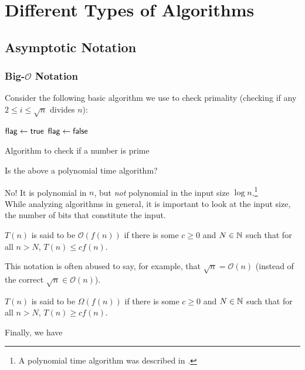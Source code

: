 \section{Different Types of Algorithms}

\subsection{Asymptotic Notation}

\subsubsection{Big-\texorpdfstring{$\mathcal{O}$}{O} Notation}

Consider the following basic algorithm we use to check primality (checking if any $2\leq i\leq \sqrt{n}$ divides $n$):

\begin{algorithm}
	\DontPrintSemicolon
	$\mathsf{flag}\gets\mathsf{true}$\;
	 {
		 {
			$\mathsf{flag}\gets\mathsf{false}$
		}
	}
	\caption{Algorithm to check if a number is prime}
\end{algorithm}

Is the above a polynomial time algorithm?

No! It is polynomial in $n$, but \textit{not} polynomial in the input size $\log n$.\footnote{A polynomial time algorithm was described in \cite{AKS-primality}.}\\
While analyzing algorithms in general, it is important to look at the input size, the number of bits that constitute the input.

\begin{definition}
$T(n)$ is said to be $\mathcal{O}(f(n))$ if there is some $c\geq 0$ and $N\in\mathbb{N}$ such that for all $n>N$, $T(n)\leq cf(n)$.
\end{definition}

This notation is often abused to say, for example, that $\sqrt{n} = \mathcal{O}(n)$ (instead of the correct $\sqrt{n}\in\mathcal{O}(n)$).

\begin{definition}
$T(n)$ is said to be $\Omega(f(n))$ if there is some $c\geq 0$ and $N\in\mathbb{N}$ such that for all $n>N$, $T(n)\geq cf(n)$.
\end{definition}

Finally, we have

